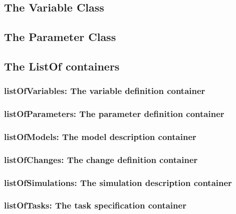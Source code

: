 \subsection{The Variable Class}


\subsection{The Parameter Class}



\subsection{The ListOf containers}


  \subsubsection{listOfVariables: The variable definition container}
  

  \subsubsection{listOfParameters: The parameter definition container}
  

  \subsubsection{listOfModels: The model description container}
  

  \subsubsection{listOfChanges: The change definition container}
  

  \subsubsection{listOfSimulations: The simulation description container}
  

  \subsubsection{listOfTasks: The task specification container}
  


